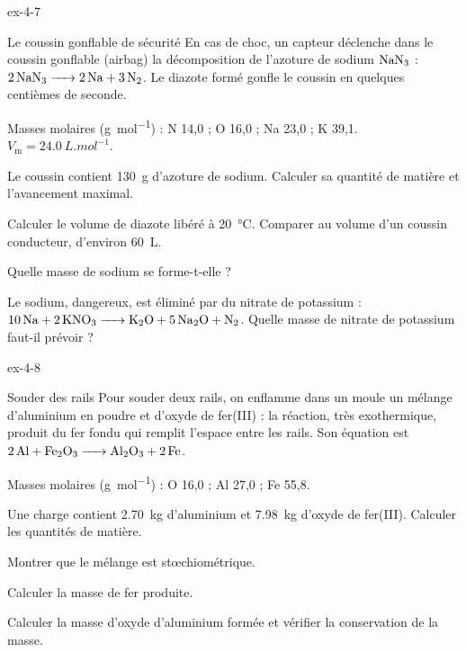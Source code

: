 \begin{blocLivre}{ex-4-7}
\begin{exercice}[2]{Le coussin gonflable de sécurité}
En cas de choc, un capteur déclenche dans le coussin gonflable (airbag) la décomposition de l'azoture de sodium $\ce{NaN3}$ :
$\ce{2NaN3 -> 2Na + 3N2}$. Le diazote formé gonfle le coussin en quelques centièmes de seconde.
\begin{donnees}
Masses molaires (\unit{g.mol^{-1}}) : N 14,0 ; O 16,0 ; Na 23,0 ; K 39,1. $V_\mathrm{m}=\qty{24,0}{L.mol^{-1}}$.
\end{donnees}
\begin{questions}
\item Le coussin contient \qty{130}{g} d'azoture de sodium. Calculer sa quantité de matière et l'avancement maximal.
\item Calculer le volume de diazote libéré à \qty{20}{\degreeCelsius}. Comparer au volume d'un coussin conducteur, d'environ \qty{60}{L}.
\item Quelle masse de sodium se forme-t-elle ?
\item Le sodium, dangereux, est éliminé par du nitrate de potassium : $\ce{10Na + 2KNO3 -> K2O + 5Na2O + N2}$. Quelle masse de nitrate
de potassium faut-il prévoir ?
\end{questions}
\end{exercice}
\end{blocLivre}
\begin{blocLivre}{ex-4-8}
\begin{exercice}[2]{Souder des rails}
Pour souder deux rails, on enflamme dans un moule un mélange d'aluminium en poudre et d'oxyde de fer(III) : la réaction,
très exothermique, produit du fer fondu qui remplit l'espace entre les rails. Son équation est $\ce{2Al + Fe2O3 -> Al2O3 + 2Fe}$.
\begin{donnees}
Masses molaires (\unit{g.mol^{-1}}) : O 16,0 ; Al 27,0 ; Fe 55,8.
\end{donnees}
\begin{questions}
\item Une charge contient \qty{2,70}{kg} d'aluminium et \qty{7,98}{kg} d'oxyde de fer(III). Calculer les quantités de matière.
\item Montrer que le mélange est stœchiométrique.
\item Calculer la masse de fer produite.
\item Calculer la masse d'oxyde d'aluminium formée et vérifier la conservation de la masse.
\end{questions}
\end{exercice}
\end{blocLivre}
